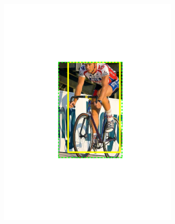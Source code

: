 \begin{figure}[hbt]
    \centering
    \begin{subfigure}[b]{0.45\textwidth}
        \centering
        \includegraphics[width=\textwidth]{TP34}
        \caption{}
        \label{fig:dettp1}
    \end{subfigure}
    ~
    \begin{subfigure}[b]{0.45\textwidth}
        \centering

\end{subfigure}
\end{figure}
